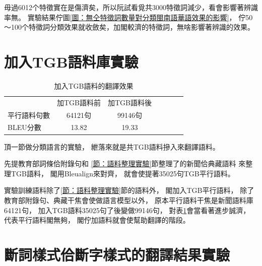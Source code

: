 毋過6012个特徵實在是傷濟矣，所以阮試看覓共3000特徵詞減少，看會影響著辨識率無。
實驗結果佇圖\ref{圖：無仝特徵詞數量對分類閩南語華語效果的影響}，
佇50～100个特徵詞分類效果就收斂矣，加閣較濟的特徵詞，無啥影響著辨識的效果。

\section{加入TGB語料庫實驗}
\label{節：加入TGB語料庫實驗}

\begin{table}
\caption{加入TGB語料的翻譯效果}
\label{表：加入TGB語料的翻譯效果}
\centering
\begin{tabular}{lcccccc}
& 加TGB語料前 & 加TGB語料後\\
平行語料句數 & 64121句 & 99146句\\
BLEU分數 & 13.82 & 19.33\\
\end{tabular}
\end{table}

頂一節做分類語言的實驗，
紲落來就是共TGB語料摻入來翻譯語料。

先提教育部詞條佮附錄句和
\ref{節：語料整理實驗}節整理了的新聞佮典藏語料
來整理TGB語料，
閣用Bleualign來對齊，
就會使提著35025句TGB平行語料。

實驗訓練語料除了\ref{節：語料整理實驗}節的語料外，
閣加入TGB平行語料，
除了教育部附錄句、典藏干焦會使做語言模型以外，
原本平行語料干焦是新聞語料庫64121句，
加入TGB語料35025句了後變做99146句，
對表\ref{表：加入TGB語料的翻譯效果}會當看著進步誠濟，
代表平行語料閣無夠，
閣佇加語料就會使幫助翻譯的階段。

\section{斷詞樣式佮斷字樣式的翻譯結果實驗}
\label{節：斷詞樣式佮斷字樣式的翻譯結果實驗}



